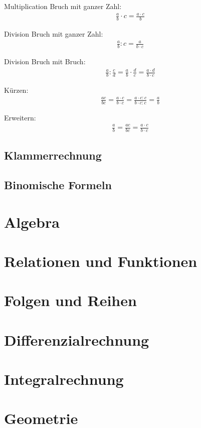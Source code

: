 \documentclass[8pt,a4paper,fleqn]{article}
\begin{document}
Multiplication Bruch mit ganzer Zahl:
\begin{align*}
\frac{a}{b} \cdot c = \frac{a \cdot c}{b} 
\end{align*}

Division Bruch mit ganzer Zahl:
\begin{align*}
\frac{a}{b} : c = \frac{a}{b \cdot c} 
\end{align*}

Division Bruch mit Bruch:
\begin{align*}
\frac{a}{b} : \frac{c}{d} = \frac{a}{b}  \cdot \frac{d}{c} = \frac{a \cdot d }{b \cdot c} 
\end{align*}

Kürzen:
\begin{align*}
\frac{ac}{bc} = \frac{a \cdot c}{b \cdot c} =  \frac{a \cdot c : c }{b \cdot c : c} =\frac{a}{b} 
\end{align*}

Erweitern:
\begin{align*}
\frac{a}{b} =  \frac{ac}{bc} =   \frac{a \cdot c}{b \cdot c} 
\end{align*}

\subsection{Klammerrechnung}
\subsection{Binomische Formeln}
\section{Algebra}
\section{Relationen und Funktionen}
\section{Folgen und Reihen}
\section{Differenzialrechnung}
\section{Integralrechnung}
\section{Geometrie}
\end{document}

